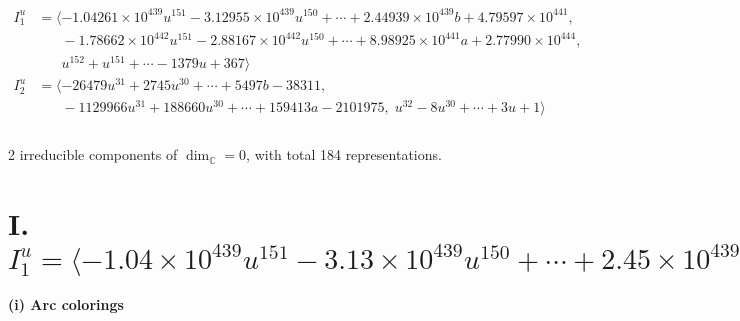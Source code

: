 \documentclass[1p]{elsarticle_modified}
\theoremstyle{definition}
\begin{document}
\begin{align*}
I^u_{1}&=\langle 
-1.04261\times10^{439} u^{151}-3.12955\times10^{439} u^{150}+\cdots+2.44939\times10^{439} b+4.79597\times10^{441},\\
\phantom{I^u_{1}}&\phantom{= \langle  }-1.78662\times10^{442} u^{151}-2.88167\times10^{442} u^{150}+\cdots+8.98925\times10^{441} a+2.77990\times10^{444},\\
\phantom{I^u_{1}}&\phantom{= \langle  }u^{152}+u^{151}+\cdots-1379 u+367\rangle \\
I^u_{2}&=\langle 
-26479 u^{31}+2745 u^{30}+\cdots+5497 b-38311,\\
\phantom{I^u_{2}}&\phantom{= \langle  }-1129966 u^{31}+188660 u^{30}+\cdots+159413 a-2101975,\;u^{32}-8 u^{30}+\cdots+3 u+1\rangle \\
\\
\end{align*}
\raggedright * 2 irreducible components of $\dim_{\mathbb{C}}=0$, with total 184 representations.\\
\newpage
\renewcommand{\arraystretch}{1}
\centering \section*{I. $I^u_{1}= \langle -1.04\times10^{439} u^{151}-3.13\times10^{439} u^{150}+\cdots+2.45\times10^{439} b+4.80\times10^{441},\;-1.79\times10^{442} u^{151}-2.88\times10^{442} u^{150}+\cdots+8.99\times10^{441} a+2.78\times10^{444},\;u^{152}+u^{151}+\cdots-1379 u+367 \rangle$}
\flushleft \textbf{(i) Arc colorings}\\
\end{document}
